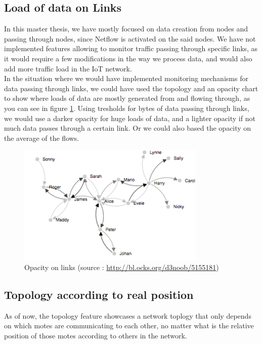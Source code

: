 \subsection{Load of data on Links}

In this master thesis, we have mostly focused on data creation from nodes and passing through nodes, since Netflow is activated on the said nodes. We have not implemented features allowing to monitor traffic passing through specific links, as it would require a few modifications in the way we process data, and would also add more traffic load in the IoT network.\\

In the situation where we would have implemented monitoring mechanisms for data passing through links, we could have used the topology and an opacity chart to show where loads of data are mostly generated from and flowing through, as you can see in figure \ref{fig:opacity}. Using tresholds for bytes of data passing through links, we would use a darker opacity for huge loads of data, and a lighter opacity if not much data passes through a certain link. Or we could also based the opacity on the average of the flows.

\begin{figure}[!h]
	\centering
	\includegraphics[width=0.8\textwidth]{res/opacity.png}
	\caption{Opacity on links (source : \url{http://bl.ocks.org/d3noob/5155181})}
	\label{fig:opacity}
\end{figure}

\subsection{Topology according to real position}

As of now, the topology feature showcases a network toplogy that only depends on which motes are communicating to each other, no matter what is the relative position of those motes according to others in the network. \\

